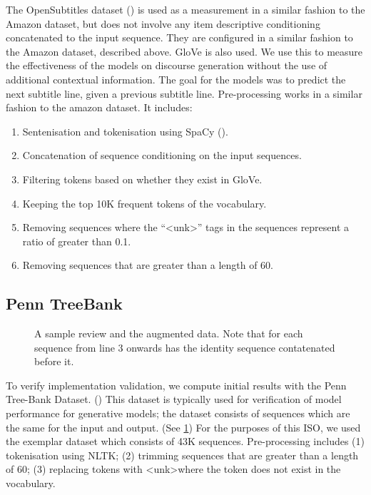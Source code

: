 \documentclass[12pt,twoside]{report}
\begin{document}
The OpenSubtitles dataset (\cite{lison_opensubtitles2016:_2016}) is used as a measurement in a similar fashion to the Amazon dataset, but does not involve any item descriptive conditioning concatenated to the input sequence. They are configured in a similar fashion to the Amazon dataset, described above. GloVe is also used. We use this to measure the effectiveness of the models on discourse generation without the use of additional contextual information. The goal for the models was to predict the next subtitle line, given a previous subtitle line. Pre-processing works in a similar fashion to the amazon dataset. It includes:


\begin{enumerate}  
	\item Sentenisation and tokenisation using SpaCy (\cite{honnibal_spacy_2017}).
	\item Concatenation of sequence conditioning on the input sequences.
	\item Filtering tokens based on whether they exist in GloVe.
	\item Keeping the top 10K frequent tokens of the vocabulary.
	\item Removing sequences where the ``\textless{}unk\textgreater'' tags in the sequences represent a ratio of greater than 0.1.
	\item Removing sequences that are greater than a length of 60. 
\end{enumerate}

\subsection{Penn TreeBank}

\begin{figure}[!ht]
	\centering
	
	\caption{A sample review and the augmented data. Note that for each sequence from line 3 onwards has the identity sequence contatenated before it. \label{ex_dataset:ptb}}
	\end{figure}

To verify implementation validation, we compute initial results with the Penn Tree-Bank Dataset. (\cite{marcus_building_2002}) This dataset is typically used for verification of model performance for generative models; the dataset consists of sequences which are the same for the input and output. (See \ref{ex_dataset:ptb}) For the purposes of this ISO, we used the exemplar dataset which consists of 43K sequences. Pre-processing includes (1) tokenisation using NLTK; (2) trimming sequences that are greater than a length of 60; (3) replacing tokens with \textless{}unk\textgreater where the token does not exist in the vocabulary. 
\end{document}

